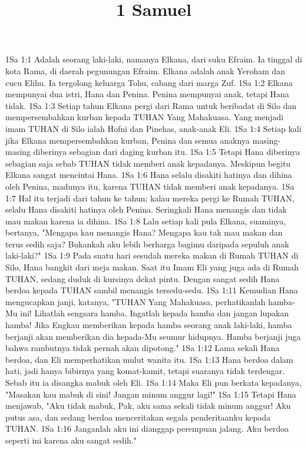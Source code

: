 

\title{1 Samuel}

1Sa 1:1  Adalah seorang laki-laki, namanya Elkana, dari suku Efraim. Ia tinggal di kota Rama, di daerah pegunungan Efraim. Elkana adalah anak Yeroham dan cucu Elihu. Ia tergolong keluarga Tohu, cabang dari marga Zuf.
1Sa 1:2  Elkana mempunyai dua istri, Hana dan Penina. Penina mempunyai anak, tetapi Hana tidak.
1Sa 1:3  Setiap tahun Elkana pergi dari Rama untuk beribadat di Silo dan mempersembahkan kurban kepada TUHAN Yang Mahakuasa. Yang menjadi imam TUHAN di Silo ialah Hofni dan Pinehas, anak-anak Eli.
1Sa 1:4  Setiap kali jika Elkana mempersembahkan kurban, Penina dan semua anaknya masing-masing diberinya sebagian dari daging kurban itu.
1Sa 1:5  Tetapi Hana diberinya sebagian saja sebab TUHAN tidak memberi anak kepadanya. Meskipun begitu Elkana sangat mencintai Hana.
1Sa 1:6  Hana selalu disakiti hatinya dan dihina oleh Penina, madunya itu, karena TUHAN tidak memberi anak kepadanya.
1Sa 1:7  Hal itu terjadi dari tahun ke tahun; kalau mereka pergi ke Rumah TUHAN, selalu Hana disakiti hatinya oleh Penina. Seringkali Hana menangis dan tidak mau makan karena ia dihina.
1Sa 1:8  Lalu setiap kali pula Elkana, suaminya, bertanya, "Mengapa kau menangis Hana? Mengapa kau tak mau makan dan terus sedih saja? Bukankah aku lebih berharga bagimu daripada sepuluh anak laki-laki?"
1Sa 1:9  Pada suatu hari sesudah mereka makan di Rumah TUHAN di Silo, Hana bangkit dari meja makan. Saat itu Imam Eli yang juga ada di Rumah TUHAN, sedang duduk di kursinya dekat pintu. Dengan sangat sedih Hana berdoa kepada TUHAN sambil menangis tersedu-sedu.
1Sa 1:11  Kemudian Hana mengucapkan janji, katanya, "TUHAN Yang Mahakuasa, perhatikanlah hamba-Mu ini! Lihatlah sengsara hamba. Ingatlah kepada hamba dan jangan lupakan hamba! Jika Engkau memberikan kepada hamba seorang anak laki-laki, hamba berjanji akan memberikan dia kepada-Mu seumur hidupnya. Hamba berjanji juga bahwa rambutnya tidak pernah akan dipotong."
1Sa 1:12  Lama sekali Hana berdoa, dan Eli memperhatikan mulut wanita itu.
1Sa 1:13  Hana berdoa dalam hati, jadi hanya bibirnya yang komat-kamit, tetapi suaranya tidak terdengar. Sebab itu ia disangka mabuk oleh Eli.
1Sa 1:14  Maka Eli pun berkata kepadanya, "Masakan kau mabuk di sini! Jangan minum anggur lagi!"
1Sa 1:15  Tetapi Hana menjawab, "Aku tidak mabuk, Pak, aku sama sekali tidak minum anggur! Aku putus asa, dan sedang berdoa menceritakan segala penderitaanku kepada TUHAN.
1Sa 1:16  Janganlah aku ini dianggap perempuan jalang. Aku berdoa seperti ini karena aku sangat sedih."
